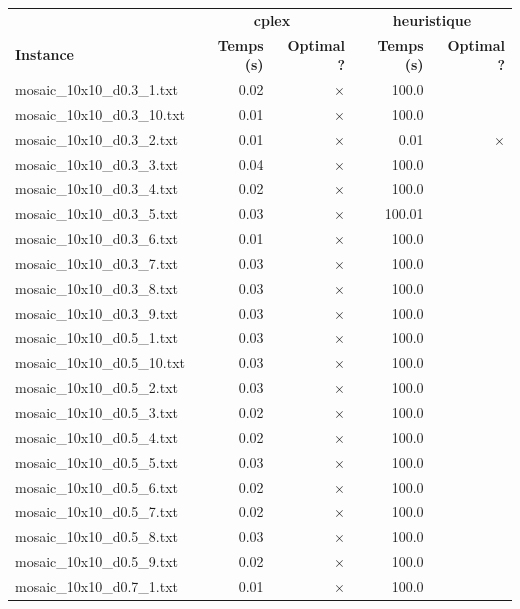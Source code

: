 \documentclass{article}
\begin{document}
\begin{center}
\renewcommand{\arraystretch}{1.4} 
 \begin{tabular}{lrrrr}
	\hline
 & \multicolumn{2}{c}{\textbf{cplex}} & \multicolumn{2}{c}{\textbf{heuristique}}\\
\textbf{Instance}  & \textbf{Temps (s)} & \textbf{Optimal ?}  & \textbf{Temps (s)} & \textbf{Optimal ?} \\\hline

mosaic\_10x10\_d0.3\_1.txt & 0.02 & 
$\times$
 & 100.0 & 
\\
mosaic\_10x10\_d0.3\_10.txt & 0.01 & 
$\times$
 & 100.0 & 
\\
mosaic\_10x10\_d0.3\_2.txt & 0.01 & 
$\times$
 & 0.01 & 
$\times$
\\
mosaic\_10x10\_d0.3\_3.txt & 0.04 & 
$\times$
 & 100.0 & 
\\
mosaic\_10x10\_d0.3\_4.txt & 0.02 & 
$\times$
 & 100.0 & 
\\
mosaic\_10x10\_d0.3\_5.txt & 0.03 & 
$\times$
 & 100.01 & 
\\
mosaic\_10x10\_d0.3\_6.txt & 0.01 & 
$\times$
 & 100.0 & 
\\
mosaic\_10x10\_d0.3\_7.txt & 0.03 & 
$\times$
 & 100.0 & 
\\
mosaic\_10x10\_d0.3\_8.txt & 0.03 & 
$\times$
 & 100.0 & 
\\
mosaic\_10x10\_d0.3\_9.txt & 0.03 & 
$\times$
 & 100.0 & 
\\
mosaic\_10x10\_d0.5\_1.txt & 0.03 & 
$\times$
 & 100.0 & 
\\
mosaic\_10x10\_d0.5\_10.txt & 0.03 & 
$\times$
 & 100.0 & 
\\
mosaic\_10x10\_d0.5\_2.txt & 0.03 & 
$\times$
 & 100.0 & 
\\
mosaic\_10x10\_d0.5\_3.txt & 0.02 & 
$\times$
 & 100.0 & 
\\
mosaic\_10x10\_d0.5\_4.txt & 0.02 & 
$\times$
 & 100.0 & 
\\
mosaic\_10x10\_d0.5\_5.txt & 0.03 & 
$\times$
 & 100.0 & 
\\
mosaic\_10x10\_d0.5\_6.txt & 0.02 & 
$\times$
 & 100.0 & 
\\
mosaic\_10x10\_d0.5\_7.txt & 0.02 & 
$\times$
 & 100.0 & 
\\
mosaic\_10x10\_d0.5\_8.txt & 0.03 & 
$\times$
 & 100.0 & 
\\
mosaic\_10x10\_d0.5\_9.txt & 0.02 & 
$\times$
 & 100.0 & 
\\
mosaic\_10x10\_d0.7\_1.txt & 0.01 & 
$\times$
 & 100.0 & 
\\

\end{tabular}
\end{center}
\end{document}
